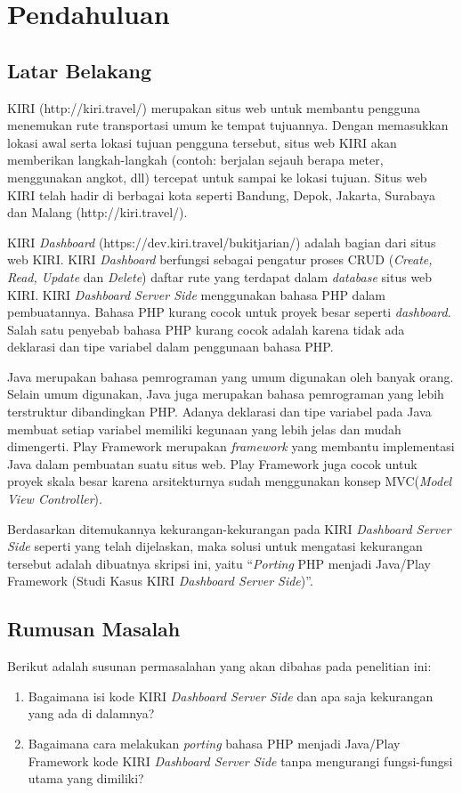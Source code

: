 \chapter{Pendahuluan}
\label{chap:pendahuluan}

\section{Latar Belakang}
\label{sec:latar_belakang}
KIRI (http://kiri.travel/) merupakan situs web untuk membantu pengguna menemukan rute transportasi umum ke tempat tujuannya. Dengan memasukkan lokasi awal serta lokasi tujuan pengguna tersebut, situs web KIRI akan memberikan langkah-langkah (contoh: berjalan sejauh berapa meter, menggunakan angkot, dll) tercepat untuk sampai ke lokasi tujuan. Situs web KIRI telah hadir di berbagai kota seperti Bandung, Depok, Jakarta, Surabaya dan Malang (http://kiri.travel/).

KIRI \textit{Dashboard} (https://dev.kiri.travel/bukitjarian/) adalah bagian dari situs web KIRI. KIRI \textit{Dashboard} berfungsi sebagai pengatur proses CRUD (\textit{Create, Read, Update} dan \textit{Delete}) daftar rute yang terdapat dalam \textit{database} situs web KIRI. KIRI \textit{Dashboard Server Side} menggunakan bahasa PHP dalam pembuatannya. Bahasa PHP kurang cocok untuk proyek besar seperti \textit{dashboard}. Salah satu penyebab bahasa PHP kurang cocok adalah karena tidak ada deklarasi dan tipe variabel dalam penggunaan bahasa PHP.

Java merupakan bahasa pemrograman yang umum digunakan oleh banyak orang. Selain umum digunakan, Java juga merupakan bahasa pemrograman yang lebih terstruktur dibandingkan PHP. Adanya deklarasi dan tipe variabel pada Java membuat setiap variabel memiliki kegunaan yang lebih jelas dan mudah dimengerti. Play Framework merupakan \textit{framework} yang membantu implementasi Java dalam pembuatan suatu situs web. Play Framework juga cocok untuk proyek skala besar karena arsitekturnya sudah menggunakan konsep MVC(\textit{Model View Controller}).

Berdasarkan ditemukannya kekurangan-kekurangan pada KIRI \textit{Dashboard Server Side} seperti yang telah dijelaskan, maka solusi untuk mengatasi kekurangan tersebut adalah dibuatnya skripsi ini, yaitu ``\textit{Porting} PHP menjadi Java/Play Framework (Studi Kasus KIRI \textit{Dashboard Server Side})''.

\section{Rumusan Masalah}
\label{sec:rumusan_masalah}
Berikut adalah susunan permasalahan yang akan dibahas pada penelitian ini:
	\begin{enumerate}
		\item Bagaimana isi kode KIRI \textit{Dashboard Server Side} dan apa saja kekurangan yang ada di dalamnya?
		\item Bagaimana cara melakukan \textit{porting} bahasa PHP menjadi Java/Play Framework kode KIRI \textit{Dashboard Server Side} tanpa mengurangi fungsi-fungsi utama yang dimiliki?
	\end{enumerate}
	
